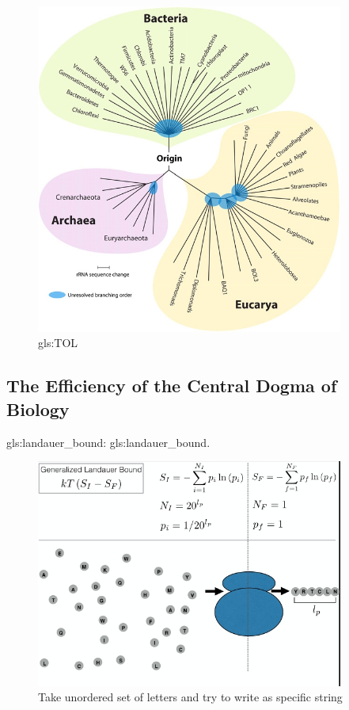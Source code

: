 \documentclass[]{article}
\begin{document}
\begin{figure}[H]
	\caption[Tree of Life]{\gls{gls:TOL}\cite{nair2012woese}}\label{fig:TOL} 
	\includegraphics[width=0.9\textwidth]{TOL}
\end{figure}

\subsection{The Efficiency of the Central Dogma of Biology}

\gls{gls:landauer_bound}: \glsdesc{gls:landauer_bound}. 

\begin{figure}[H]
	\caption[Take unordered set of letters and try to write as specific string]{Take unordered set of letters and try to write as specific string\cite{kempes2017thermodynamic}}\label{fig:LandauerRibosome} 
	\includegraphics[width=0.9\textwidth]{LandauerRibosome}
\end{figure}
\end{document}
